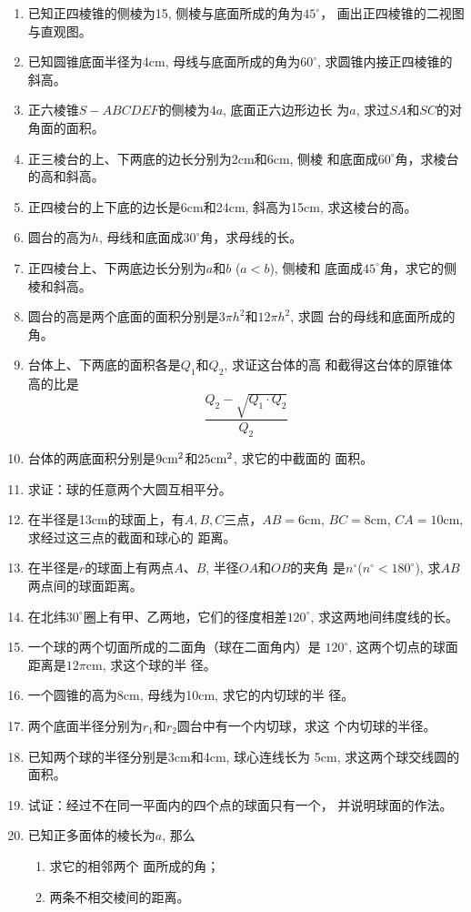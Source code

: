 \begin{enumerate}
\item 已知正四棱锥的侧棱为15, 侧棱与底面所成的角为$45^{\circ}$，
画出正四棱锥的二视图与直观图。
\item 已知圆锥底面半径为4cm, 母线与底面所成的角为$60^{\circ}$,
求圆锥内接正四棱锥的斜高。
\item 正六棱锥$S-ABCDEF$的侧棱为$4a$, 底面正六边形边长
为$a$, 求过$SA$和$SC$的对角面的面积。
\item 正三棱台的上、下两底的边长分别为2cm和6cm, 侧棱
和底面成$60^{\circ}$角，求棱台的高和斜高。
\item 正四棱台的上下底的边长是6cm和24cm, 斜高为15cm, 
求这棱台的高。
\item 圆台的高为$h$, 母线和底面成$30^{\circ}$角，求母线的长。
\item 正四棱台上、下两底边长分别为$a$和$b$ ($a<b$), 侧棱和
底面成$45^{\circ}$角，求它的侧棱和斜高。
\item 圆台的高是两个底面的面积分别是$3\pi h^2$和$12\pi h^2$, 求圆
台的母线和底面所成的角。
\item 台体上、下两底的面积各是$Q_1$和$Q_2$, 求证这台体的高
和截得这台体的原锥体高的比是
\[\frac{Q_2-\sqrt{Q_1\cdot Q_2}}{Q_2}\]
\item 台体的两底面积分别是$9{\rm cm^2}$和$25{\rm cm^2}$, 求它的中截面的
面积。
\item 求证：球的任意两个大圆互相平分。
\item 在半径是13cm的球面上，有$A,B,C$三点，$AB=6$cm, 
$BC=8$cm, $CA=10$cm, 求经过这三点的截面和球心的
距离。
\item 在半径是$r$的球面上有两点$A$、$B$, 半径$OA$和$OB$的夹角
是$n^{\circ}$($n^{\circ}<180^{\circ}$), 求$AB$两点间的球面距离。
\item 在北纬$30^{\circ}$圈上有甲、乙两地，它们的径度相差$120^{\circ}$,
求这两地间纬度线的长。
\item 一个球的两个切面所成的二面角（球在二面角内）是
$120^{\circ}$, 这两个切点的球面距离是$12\pi$cm, 求这个球的半
径。
\item 一个圆锥的高为8cm, 母线为10cm, 求它的内切球的半
径。
\item 两个底面半径分别为$r_1$和$r_2$圆台中有一个内切球，求这
个内切球的半径。
\item 已知两个球的半径分别是3cm和4cm, 球心连线长为
5cm, 求这两个球交线圆的面积。
\item 试证：经过不在同一平面内的四个点的球面只有一个，
并说明球面的作法。
\item 已知正多面体的棱长为$a$, 那么
\begin{enumerate}
\item 求它的相邻两个
面所成的角；
\item 两条不相交棱间的距离。
\end{enumerate}


\end{enumerate}
